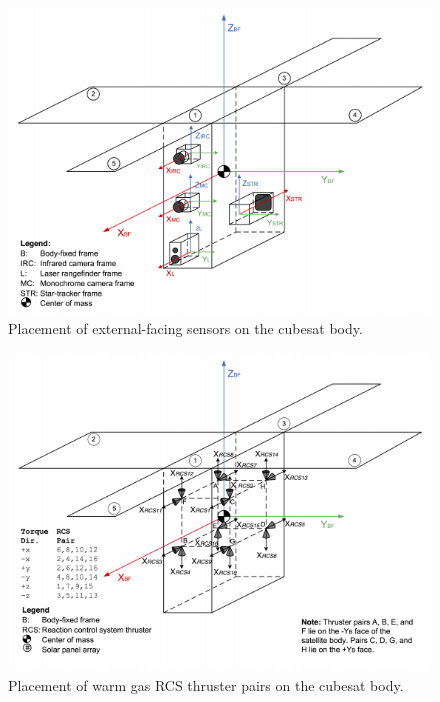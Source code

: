 \documentclass[letterpaper, 11 pt, conference]{ieeeconf}  %
\begin{document}
\begin{figure}
  \centering
  \includegraphics[width=\linewidth]{sensor_placement}
  \caption{Placement of external-facing sensors on the cubesat body.}
  \label{fig:sensor_placement}
\end{figure}

\begin{figure}
  \centering
  \includegraphics[width=\linewidth]{rcs_placement}
  \caption{Placement of warm gas RCS thruster pairs on the cubesat body.}
  \label{fig:rcs_placement}
\end{figure}
\end{document}

